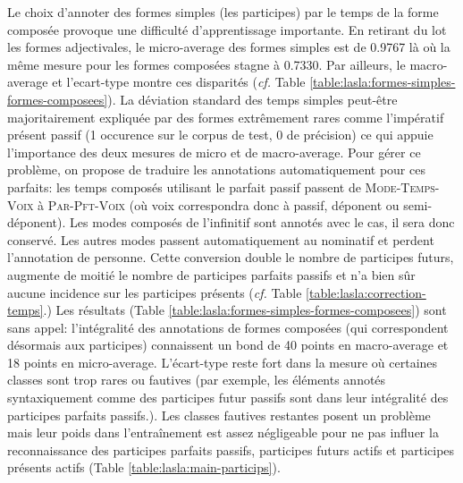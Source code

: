 Le choix d'annoter des formes simples (les participes) par le temps de la forme composée provoque une difficulté d'apprentissage importante. En retirant du lot les formes adjectivales, le \gls{micro-average} des formes simples est de 0.9767 là où la même mesure pour les formes composées stagne à 0.7330. Par ailleurs, le \gls{macro-average} et l'\gls{ecart-type} montre ces disparités (\textit{cf.} Table \ref{table:lasla:formes-simples-formes-composees}). La déviation standard des temps simples peut-être majoritairement expliquée par des formes extrêmement rares comme l'impératif présent passif (1 occurence sur le corpus de test, 0 de précision) ce qui appuie l'importance des deux mesures de micro et de macro-average. Pour gérer ce problème, on propose de traduire les annotations automatiquement pour ces parfaits: les temps composés utilisant le parfait passif passent de \textsc{Mode-Temps-Voix} à \textsc{Par-Pft-Voix} (où voix correspondra donc à passif, déponent ou semi-déponent). Les modes composés de l'infinitif sont annotés avec le cas, il sera donc conservé. Les autres modes passent automatiquement au nominatif et perdent l'annotation de personne. Cette conversion double le nombre de participes futurs, augmente de moitié le nombre de participes parfaits passifs et n'a bien sûr aucune incidence sur les participes présents (\textit{cf.} Table \ref{table:lasla:correction-temps}.) Les résultats (Table \ref{table:lasla:formes-simples-formes-composees}) sont sans appel: l'intégralité des annotations de formes composées (qui correspondent désormais aux participes) connaissent un bond de 40 points en macro-average et 18 points en micro-average. L'écart-type reste fort dans la mesure où certaines classes sont trop rares ou fautives (par exemple, les éléments annotés syntaxiquement comme des participes futur passifs sont dans leur intégralité des participes parfaits passifs.). Les classes fautives restantes posent un problème mais leur poids dans l'entraînement est assez négligeable pour ne pas influer la reconnaissance des participes parfaits passifs, participes futurs actifs et participes présents actifs (Table \ref{table:lasla:main-particips}).



